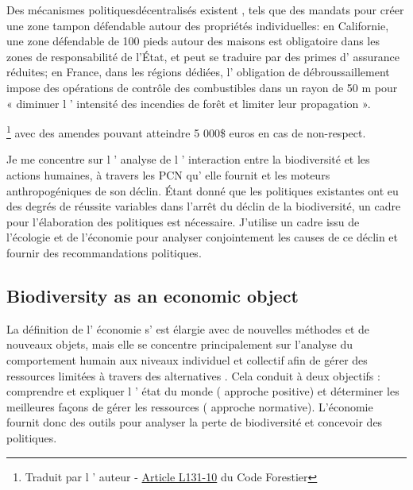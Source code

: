\begin{displayquote}
\begin{displayquote}
\begin{displayquote}
{{{  Des mécanismes politiquesdécentralisés existent , tels que des mandats pour créer une zone tampon défendable autour des propriétés individuelles: en Californie, une zone défendable de 100 pieds autour des maisons est obligatoire dans les zones de responsabilité de l'État, et peut se traduire par des primes d' assurance réduites; en France, dans les régions dédiées, l' obligation de débroussaillement impose des opérations de contrôle des combustibles dans un rayon de 50 m pour « diminuer l ' intensité des incendies de forêt et limiter leur propagation ».

\footnote{Traduit par l ' auteur - \href{https://www.legifrance.gouv.fr/codes/article_lc/LEGIARTI000047809197}{Article L131-10} du Code Forestier} avec des amendes pouvant atteindre 5 000\$ euros en cas de non-respect.





Je me concentre sur l ' analyse de l ' interaction entre la biodiversité et les actions humaines, à travers les PCN qu' elle fournit et les moteurs anthropogéniques de son déclin. Étant donné que les politiques existantes ont eu des degrés de réussite variables dans l'arrêt du déclin de la biodiversité, un cadre pour l'élaboration des politiques est nécessaire. J'utilise un cadre issu de l'écologie et de l'économie pour analyser conjointement les causes de ce déclin et fournir des recommandations politiques. 


{}
\subsection*{Biodiversity as an economic object}

 
  La définition de l' économie s' est élargie avec de nouvelles méthodes et de nouveaux objets, mais elle se concentre principalement sur l'analyse du comportement humain aux niveaux individuel et collectif afin de gérer des ressources limitées à travers des alternatives \citep{mankiw_principles_2011, bade_foundations_2002, backhouse_retrospectives_2009}. Cela conduit à deux objectifs : comprendre et expliquer l ' état du monde ( approche positive) et déterminer les meilleures façons de gérer les ressources ( approche normative). L'économie fournit donc des outils pour analyser la perte de biodiversité et concevoir des politiques.



}}}
\end{displayquote}
\end{displayquote}
\end{displayquote}
